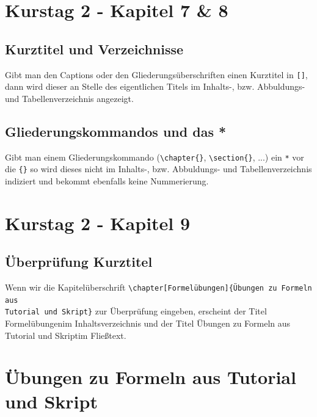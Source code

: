 \documentclass[
12pt,
ngerman
]{scrreprt}
\begin{document}
\chapter[Blatt 4]{Kurstag 2 - Kapitel 7 \& 8}
\label{cha:chap7-8}
\label{blatt:4}

\section{Kurztitel und Verzeichnisse}
\label{sec:kurztitel}
Gibt man den Captions oder den Gliederungsüberschriften einen Kurztitel in \verb![]!, dann wird dieser an Stelle des eigentlichen Titels im Inhalts-, bzw. Abbuldungs- und Tabellenverzeichnis angezeigt.

\section{Gliederungskommandos und das *}
\label{sec:*}
Gibt man einem Gliederungskommando (\verb!\chapter{}!, \verb!\section{}!, ...) ein \verb!*! vor die \verb!{}! so wird dieses nicht im Inhalts-, bzw. Abbuldungs- und Tabellenverzeichnis indiziert und bekommt ebenfalls keine Nummerierung.

\chapter[Blatt 5]{Kurstag 2 - Kapitel 9}
\label{cha:chap9}
\label{blatt:5}

\section{Überprüfung Kurztitel}
\label{sec:proof}
Wenn wir die Kapitelüberschrift \verb!\chapter[Formelübungen]{Übungen zu Formeln aus! \\ \verb!Tutorial und Skript}! zur Überprüfung eingeben, erscheint der Titel \glqq Formelübungen\grqq \:im Inhaltsverzeichnis und der Titel \glqq Übungen zu Formeln aus Tutorial und Skript\grqq \:im Fließtext.

\chapter[Formelübungen]{Übungen zu Formeln aus Tutorial und Skript}
\label{cha:formelübungen}
\end{document}
